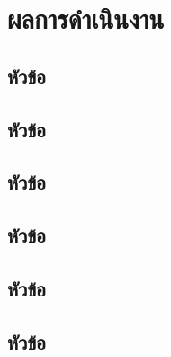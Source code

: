 \chapter{ผลการดำเนินงาน}
\label{chapter4}

\section{หัวข้อ}

\section{หัวข้อ}

\section{หัวข้อ}

\section{หัวข้อ}

\section{หัวข้อ}

\section{หัวข้อ}

